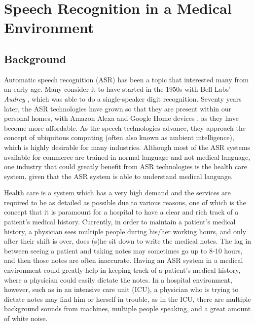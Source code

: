 
\chapter{Speech Recognition in a Medical Environment}
\section{Background}

Automatic speech recognition (ASR) has been a topic that interested many from an early age. Many consider it to have started in the 1950s with Bell Labs' \textit{Audrey} \cite{voicerecog_history}, which was able to do a single-speaker digit recognition. Seventy years later, the ASR technologies have grown so that they are present within our personal homes, with Amazon Alexa and Google Home devices \cite{asr_at_home}, as they have become more affordable. As the speech technologies advance, they approach the concept of ubiquitous computing (often also known as ambient intelligence), which is highly desirable for many industries. Although most of the ASR systems available for commerce are trained in normal language and not medical language, one industry that could greatly benefit from ASR technologies is the health care system, given that the ASR system is able to understand medical language.

Health care is a system which has a very high demand and the services are required to be as detailed as possible due to various reasons, one of which is the concept that it is paramount for a hospital to have a clear and rich track of a patient's medical history. Currently, in order to maintain a patient's medical history, a physician sees multiple people during his/her working hours, and only after their shift is over, does (s)he sit down to write the medical notes. The lag in between seeing a patient and taking notes may sometimes go up to 8-10 hours, and then those notes are often inaccurate. Having an ASR system in a medical environment could greatly help in keeping track of a patient's medical history, where a physician could easily dictate the notes. In a hospital environment, however, such as in an intensive care unit (ICU), a physician who is trying to dictate notes may find him or herself in trouble, as in the ICU, there are multiple background sounds from machines, multiple people speaking, and a great amount of white noise.

